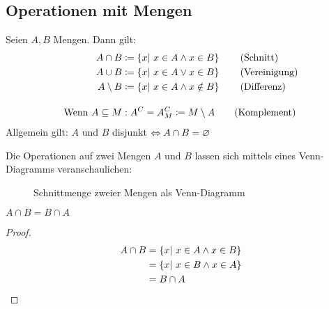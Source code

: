 \subsection{Operationen mit Mengen}

\begin{definition}[Mengenoperationen]
    Seien $A, B$ Mengen. Dann gilt:
    \begin{align*}
        A\cap B &\coloneqq \left\{x|~x\in A \land x\in B\right\}\tag{Schnitt}\\
        A\cup B &\coloneqq \left\{x|~x\in A \lor x\in B\right\}\tag{Vereinigung}\\
        A\setminus B &\coloneqq \left\{x|~x\in A \land x\notin B\right\}\tag{Differenz}\\[10pt]
        \text{Wenn } A\subseteq M&: A^{C} = A^{C}_{M} \coloneqq M\setminus A\tag{Komplement}
    \end{align*}
    Allgemein gilt: $A$ und $B$ disjunkt $\Leftrightarrow{} A\cap B = \varnothing$
\end{definition}

\begin{visualisierung}
    Die Operationen auf zwei Mengen $A$ und $B$ lassen sich mittels eines Venn-Diagramms veranschaulichen:
    \begin{figure}[H]
        \centering
        \caption{Schnittmenge zweier Mengen als Venn-Diagramm}
    \end{figure}
\end{visualisierung}


\begin{lemma}
    \marginnote{[31. Okt]}
    $A\cap B = B \cap A$
    \begin{proof}
        \begin{align*}
            A\cap B &= \left\{x|~x\in A \land x \in B\right\}\\
            &= \left\{x|~x\in B \land x \in A\right\}\\
            &= B\cap A\qedhere
        \end{align*}
    \end{proof}
\end{lemma}


